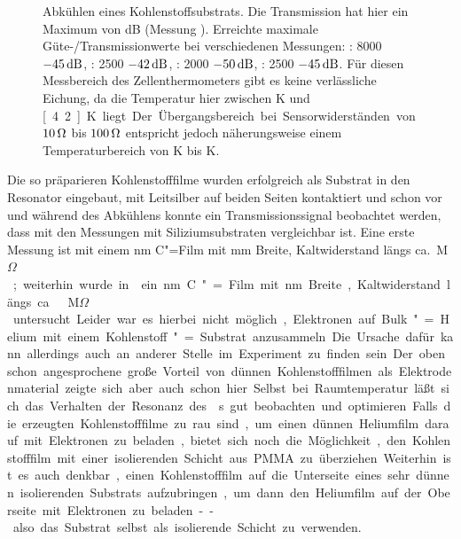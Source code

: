 \begin{figure}[h!tb]
	\hfill%
	\begin{minipage}[b]{\linewidth-\tabcolsep-\smidwidth}
		\caption[Verhalten der Transmission während des Abkühlens eines C"=Substrats]{Abkühlen eines Kohlenstoffsubstrats. Die Transmission hat hier ein Maximum von \unit[-50]{dB} (Messung ). Erreichte maximale Güte-/Transmissionwerte bei verschiedenen Messungen: : 8000 $\unit[-45]{dB}$, : 2500 $\unit[-42]{dB}$, : 2000 $\unit[-50]{dB}$, : 2500 $\unit[-45]{dB}$. Für diesen Messbereich des Zellenthermometers gibt es keine verlässliche Eichung, da die Temperatur hier zwischen \unit[77]{K} und \unit[4.2]{K} liegt. Der Übergangsbereich  bei Sensorwiderständen von $\unit[10]{\Omega}$ bis $\unit[100]{\Omega}$ entspricht jedoch näherungsweise einem Temperaturbereich von \unit[20]{K} bis \unit[10]{K}.\label{fig:c_cooldown}}
	\end{minipage}
\end{figure}

Die so präparieren Kohlenstofffilme wurden erfolgreich als Substrat in den Resonator eingebaut, mit Leitsilber auf beiden Seiten kontaktiert und schon vor und während des Abkühlens konnte ein Transmissionssignal beobachtet werden, dass mit den Messungen mit Siliziumsubstraten vergleichbar ist. Eine erste Messung ist  mit einem \unit[7]{nm} C"=Film mit \unit[5]{mm} Breite, Kaltwiderstand längs ca.\ \unit[8]{M$\Omega$} ; weiterhin wurde in  ein \unit[15]{nm} C"=Film mit \unit[7]{nm} Breite, Kaltwiderstand längs ca.\ \unit[1]{M$\Omega$} untersucht. Leider war es hierbei nicht möglich, Elektronen auf Bulk"=Helium mit einem Kohlenstoff"=Substrat anzusammeln. Die Ursache dafür kann allerdings auch an anderer Stelle im Experiment zu finden sein. Der oben schon angesprochene große Vorteil von dünnen Kohlenstofffilmen als Elektrodenmaterial zeigte sich aber auch schon hier. Selbst bei Raumtemperatur läßt sich das Verhalten der Resonanz des \HR{}s gut beobachten und optimieren.

Falls die erzeugten Kohlenstofffilme zu rau sind, um einen dünnen Heliumfilm darauf mit Elektronen zu beladen, bietet sich noch die Möglichkeit, den Kohlenstofffilm mit einer isolierenden Schicht aus PMMA zu überziehen. Weiterhin ist es auch denkbar, einen Kohlenstofffilm auf die Unterseite eines sehr dünnen isolierenden Substrats aufzubringen, um dann den Heliumfilm auf der Oberseite mit Elektronen zu beladen -- also das Substrat selbst als isolierende Schicht zu verwenden.


